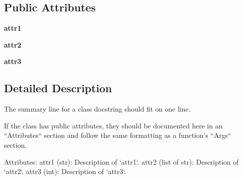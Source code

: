 \subsection*{Public Attributes}
\begin{DoxyCompactItemize}
\item 
\hypertarget{classgoogle__docstring__example_1_1ExampleClass_a6fa2ed2716c1ae7ec406eeb02329d652}{{\bfseries attr1}}\label{classgoogle__docstring__example_1_1ExampleClass_a6fa2ed2716c1ae7ec406eeb02329d652}

\item 
\hypertarget{classgoogle__docstring__example_1_1ExampleClass_aeace93f22e79d4dbb60e1bac15b149fa}{{\bfseries attr2}}\label{classgoogle__docstring__example_1_1ExampleClass_aeace93f22e79d4dbb60e1bac15b149fa}

\item 
\hypertarget{classgoogle__docstring__example_1_1ExampleClass_a0425bdc97a8a3e22a92aeb40aa9f9416}{{\bfseries attr3}}\label{classgoogle__docstring__example_1_1ExampleClass_a0425bdc97a8a3e22a92aeb40aa9f9416}

\end{DoxyCompactItemize}


\subsection{Detailed Description}
\begin{DoxyVerb}The summary line for a class docstring should fit on one line.

If the class has public attributes, they should be documented here
in an ``Attributes`` section and follow the same formatting as a
function's ``Args`` section.

Attributes:
  attr1 (str): Description of `attr1`.
  attr2 (list of str): Description of `attr2`.
  attr3 (int): Description of `attr3`.\end{DoxyVerb}
 

